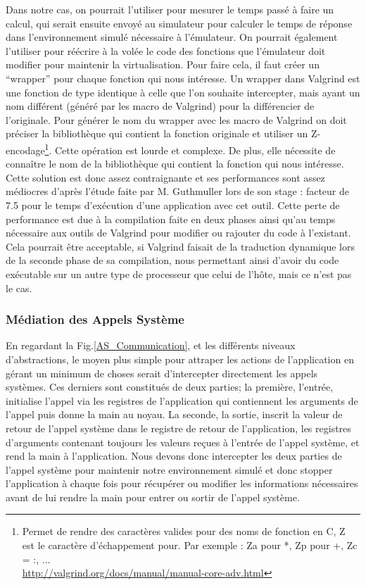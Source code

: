 Dans notre cas, on pourrait l'utiliser pour mesurer le temps passé à faire un
calcul, qui serait ensuite envoyé au simulateur pour calculer le temps de
réponse dans l'environnement simulé nécessaire à l'émulateur. On pourrait
également l'utiliser pour réécrire à la volée le code des fonctions que
l'émulateur doit modifier pour maintenir la virtualisation. Pour faire cela, il
faut créer un ``wrapper'' pour chaque fonction qui nous intéresse. Un wrapper
dans Valgrind est une fonction de type identique à celle que l'on souhaite
intercepter, mais ayant un nom différent (généré par les macro de Valgrind) pour
la différencier de l'originale. Pour générer le nom du wrapper avec les macro de
Valgrind on doit préciser la bibliothèque qui contient la fonction originale et
utiliser un Z-encodage\footnote{ Permet de rendre des caractères valides pour
  des noms de fonction en C, Z est le caractère d'échappement pour. Par exemple : Za pour *, Zp pour +, Zc = :, ... \\ \url{http://valgrind.org/docs/manual/manual-core-adv.html}}. Cette opération
est lourde et complexe. De plus, elle nécessite de connaître le nom de la
bibliothèque qui contient la fonction qui nous intéresse. Cette solution est
donc assez contraignante et ses performances sont assez médiocres d'après
l'étude faite par M. Guthmuller lors de son stage \citep{INTERCEPTIONMARION}:
facteur de 7.5 pour le temps d'exécution d'une application avec cet outil. Cette
perte de performance est due à la compilation faite en deux phases ainsi qu'au
temps nécessaire aux outils de Valgrind pour modifier ou rajouter du code à
l'existant. Cela pourrait être acceptable, si Valgrind faisait de la traduction
dynamique lors de la seconde phase de sa compilation, nous permettant ainsi
d'avoir du code exécutable sur un autre type de processeur que celui de l'hôte,
mais ce n'est pas le cas.

\subsubsection{Médiation des Appels Système}

En regardant la Fig.\ref{AS_Communication}, et les différents niveaux
d'abstractions, le moyen plus simple pour attraper les actions de l'application
en gérant un minimum de choses serait d'intercepter directement les appels
systèmes.  Ces derniers sont constitués de deux parties; la première, l'entrée,
initialise l'appel via les registres de l'application qui contiennent les
arguments de l'appel puis donne la main au noyau. La seconde, la sortie, inscrit
la valeur de retour de l'appel système dans le registre de retour de
l'application, les registres d'arguments contenant toujours les valeurs reçues à
l'entrée de l'appel système, et rend la main à l'application. Nous devons donc
intercepter les deux parties de l'appel système pour maintenir notre
environnement simulé et donc stopper l'application à chaque fois pour récupérer
ou modifier les informations nécessaires avant de lui rendre la main pour entrer
ou sortir de l'appel système.

